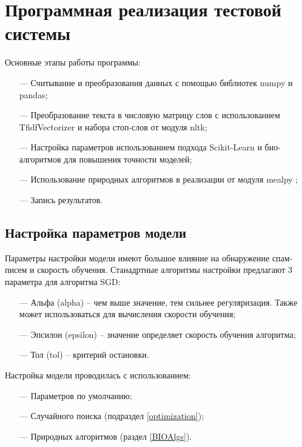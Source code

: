 \section{Программная реализация тестовой системы}

Основные этапы работы программы:

\begin{itemize}
    \item[—] Считывание и преобразования данных с помощью библиотек numpy и pandas;
    \item[—] Преобразование текста в числовую матрицу слов с использованием TfidfVectorizer\cite{scikitTfIdf} и набора стоп-слов от
        модуля nltk;
    \item[—] Настройка параметров использованием подхода Scikit-Learn \cite{scikitSGD} и био-алгоритмов
        для повышения точности моделей;
    \item[—] Использование природных алгоритмов в реализации от модуля mealpy \cite{thieu_nguyen_2020_3711949};
    \item[—] Запись результатов.
\end{itemize}

\subsection{Настройка параметров модели}

Параметры настройки модели имеют большое влияние на обнаружение спам-писем и скорость обучения. Станадртные
алгоритмы настройки предлагают 3 параметра для алгоритма SGD:

\begin{itemize}
    \item[—] Альфа (alpha) -- чем выше значение, тем сильнее регуляризация. Также может использоваться для вычисления скорости обучения;
    \item[—] Эпсилон (epsilon) -- значение определяет скорость обучения алгоритма;
    \item[—] Тол (tol) -- критерий остановки.
\end{itemize}

Настройка модели проводилась с использованием:

\begin{itemize}
    \item[—] Параметров по умолчанию;
    \item[—] Случайного поиска (подраздел \ref{optimization});
    \item[—] Природных алгоритмов (раздел \ref{BIOAlgs}).
\end{itemize}

